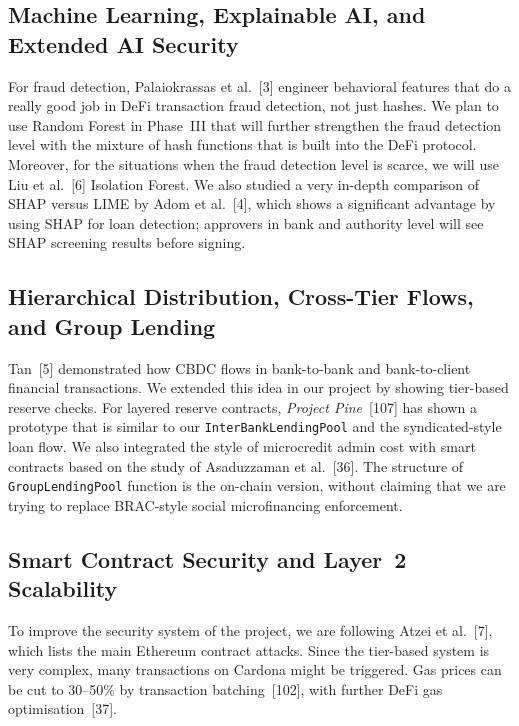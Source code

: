 \documentclass[12pt,a4paper]{report}
\begin{document}
\subsection{Machine Learning, Explainable AI, and Extended AI Security}

For fraud detection, Palaiokrassas et al.~[3] engineer behavioral features that do a really good job in DeFi transaction fraud detection, not just hashes. We plan to use Random Forest in Phase~III that will further strengthen the fraud detection level with the mixture of hash functions that is built into the DeFi protocol. Moreover, for the situations when the fraud detection level is scarce, we will use Liu et al.~[6] Isolation Forest. We also studied a very in-depth comparison of SHAP versus LIME by Adom et al.~[4], which shows a significant advantage by using SHAP for loan detection; approvers in bank and authority level will see SHAP screening results before signing.

\subsection{Hierarchical Distribution, Cross-Tier Flows, and Group Lending}
\label{sec:lit-cross-tier}

Tan~[5] demonstrated how CBDC flows in bank-to-bank and bank-to-client financial transactions. We extended this idea in our project by showing tier-based reserve checks. For layered reserve contracts, \textit{Project Pine}~[107] has shown a prototype that is similar to our \texttt{InterBankLendingPool} and the syndicated-style loan flow. We also integrated the style of microcredit admin cost with smart contracts based on the study of Asaduzzaman et al.~[36]. The structure of \texttt{GroupLendingPool} function is the on-chain version, without claiming that we are trying to replace BRAC-style social microfinancing enforcement.

\subsection{Smart Contract Security and Layer~2 Scalability}

To improve the security system of the project, we are following Atzei et al.~[7], which lists the main Ethereum contract attacks. Since the tier-based system is very complex, many transactions on Cardona might be triggered. Gas prices can be cut to 30--50\% by transaction batching~[102], with further DeFi gas optimisation~[37].
\end{document}

